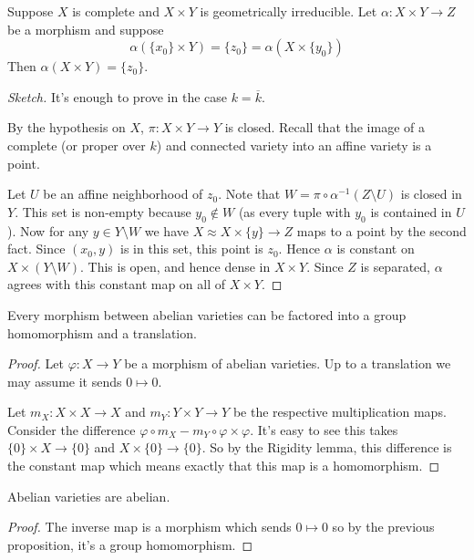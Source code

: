 \documentclass[11pt]{article}
\begin{document}
\begin{lem}
	Suppose $X$ is complete and $X\times Y$ is geometrically irreducible. Let $\alpha:X\times Y \to Z$ be a morphism and suppose
	$$
	\alpha(\{x_0\}\times Y) = \{z_0\} = \alpha(X\times\{y_0\})
	$$
	Then $\alpha(X\times Y) = \{z_0\}$.
\end{lem}
\begin{proof}[Sketch]
	It's enough to prove in the case $k = \overline{k}$.

	By the hypothesis on $X$, $\pi:X\times Y \to Y$ is closed. Recall that the image of a complete (or proper over $k$) and connected variety into an affine variety is a point.
	
	Let $U$ be an affine neighborhood of $z_0$. Note that $W = \pi\circ\alpha^{-1}(Z\setminus U)$ is closed in $Y$. This set is non-empty because $y_0\notin W$ (as every tuple with $y_0$ is contained in $U$). Now for any $y\in Y\setminus W$ we have $X\approx X\times\{y\} \to Z$ maps to a point by the second fact. Since $(x_0,y)$ is in this set, this point is $z_0$. Hence $\alpha$ is constant on $X\times(Y\setminus W)$. This is open, and hence dense in $X\times Y$. Since $Z$ is separated, $\alpha$ agrees with this constant map on all of $X\times Y$.
\end{proof}

\begin{prop}
	Every morphism between abelian varieties can be factored into a group homomorphism and a translation.
\end{prop}
\begin{proof}
	Let $\varphi:X \to Y$ be a morphism of abelian varieties. Up to a translation we may assume it sends $0\mapsto 0$.
	
	Let $m_X:X\times X \to X$ and $m_Y:Y\times Y\to Y$ be the respective multiplication maps. Consider the difference $\varphi\circ m_X - m_Y\circ\varphi\times\varphi$. It's easy to see this takes $\{0\}\times X \to \{0\}$ and $X\times\{0\} \to \{0\}$. So by the Rigidity lemma, this difference is the constant map which means exactly that this map is a homomorphism.
\end{proof}

\begin{prop}
	Abelian varieties are abelian. 
\end{prop}
\begin{proof}
	The inverse map is a morphism which sends $0\mapsto 0$ so by the previous proposition, it's a group homomorphism.
\end{proof}
\end{document}
